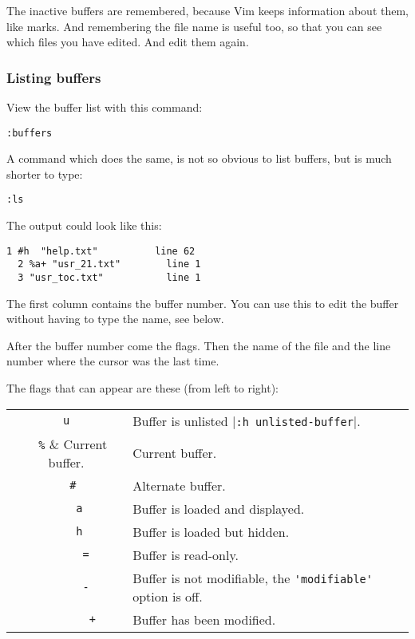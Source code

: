 The inactive buffers are remembered, because Vim keeps information about them, like marks.
And remembering the file name is useful too, so that you can see which files you have edited.
And edit them again.

\subsubsection{Listing buffers}
View the buffer list with this command:

\begin{Verbatim}[samepage=true]
 :buffers
\end{Verbatim}

A command which does the same, is not so obvious to list buffers, but is much shorter to type:

\begin{Verbatim}[samepage=true]
 :ls
\end{Verbatim}

The output could look like this:

\begin{Verbatim}[samepage=true]
  1 #h  "help.txt"          line 62 
  2 %a+ "usr_21.txt"        line 1 
  3 "usr_toc.txt"           line 1 
\end{Verbatim}

The first column contains the buffer number.
You can use this to edit the buffer without having to type the name, see below.

After the buffer number come the flags.
Then the name of the file and the line number where the cursor was the last time.
 
The flags that can appear are these (from left to right):
\begin{center} \begin{tabular}{c l}
				\verb!u! &  Buffer is unlisted |\verb!:h unlisted-buffer!|. \\
				\verb!  %! &  Current buffer. \\
				\verb!  #! &  Alternate buffer. \\
				\verb!    a! & Buffer is loaded and displayed. \\
				\verb!    h! & Buffer is loaded but hidden. \\
				\verb!      =! & Buffer is read-only. \\
				\verb!      -! & Buffer is not modifiable, the \verb!'modifiable'! option is off. \\
				\verb!        +! & Buffer has been modified. \\
\end{tabular} \end{center}
